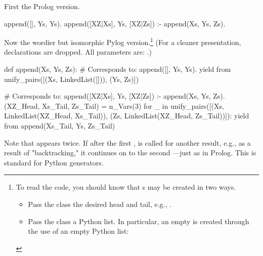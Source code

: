 \begin{itemize}[label=$\bullet$]
First the Prolog version.

\begin{minipage}{\linewidth}
\begin{python}
append([], Ys, Ys).
append([XZ|Xs], Ys, [XZ|Zs]) :- append(Xs, Ys, Zs).
\end{python}
\end{minipage}
Now the wordier but isomorphic Pylog version.\footnote{To read the code, you should know that s may be created in two ways.
\begin{itemize}
    \item Pass the  class the desired head and tail, e.g., \newline{}.
    \item Pass the   class a Python list. In particular, an empty  is created through the use of an empty Python list: 
\end{itemize}
} (For a cleaner presentation, declarations are dropped. All parameters are: .)

\begin{minipage}{\linewidth}
\begin{python}
def append(Xs, Ys, Zs):
  # Corresponds to: append([], Ys, Ys).
  yield from unify_pairs([(Xs, LinkedList([])), (Ys, Zs)])

  # Corresponds to: append([XZ|Xs], Ys, [XZ|Zs]) :- append(Xs, Ys, Zs).
  (XZ_Head, Xs_Tail, Zs_Tail) = n_Vars(3)
  for _ in unify_pairs([(Xs, LinkedList(XZ_Head, Xs_Tail)),
                        (Zs, LinkedList(XZ_Head, Zs_Tail))]):
    yield from append(Xs_Tail, Ys, Zs_Tail)

\end{python}
\end{minipage}
Note that    appears twice. If after the first  ,  is called for another result, e.g., as a result of "backtracking," it continues on to the second  ---just as in Prolog. This is standard for Python generators.
\end{itemize}

